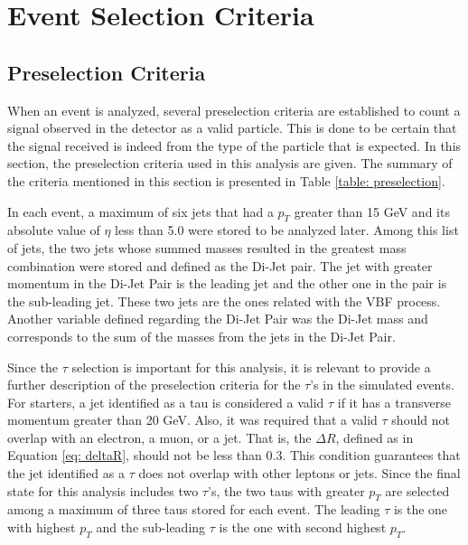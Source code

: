 \graphicspath{{SelectionCriteria/Figures/}}

\chapter{Event Selection Criteria}

\section{Preselection Criteria}

When an event is analyzed, several preselection criteria are established to count a signal observed in the detector as a valid particle. This is done to be certain that the signal received is indeed from the type of the particle that is expected. In this section, the preselection criteria used in this analysis are given. The summary of the criteria mentioned in this section is presented in Table \ref{table: preselection}. 

In each event, a maximum of six jets that had a $p_{T}$ greater than 15 GeV and its absolute value of $\eta$ less than 5.0 were stored to be analyzed later. Among this list of jets, the two jets whose summed masses resulted in the greatest mass combination were stored and defined as the Di-Jet pair. The jet with greater momentum in the Di-Jet Pair is the leading jet and the other one in the pair is the sub-leading jet. These two jets are the ones related with the VBF process. Another variable defined regarding the Di-Jet Pair was the Di-Jet mass and corresponds to the sum of the masses from the jets in the Di-Jet Pair.  

Since the $\tau$ selection is important for this analysis, it is relevant to provide a further description of the preselection criteria for the $\tau$'s in the simulated events. For starters, a jet identified as a tau is considered a valid $\tau$ if it has a transverse momentum greater than 20 GeV. Also, it was required that a valid $\tau$ should not overlap with an electron, a muon, or a jet. That is, the $\Delta R$, defined as in Equation \ref{eq: deltaR}, should not be less than 0.3. This condition guarantees that the jet identified as a $\tau$ does not overlap with other leptons or jets. Since the final state for this analysis includes two $\tau$'s, the two taus with greater $p_{T}$ are selected among a maximum of three taus stored for each event. The leading $\tau$ is the one with highest $p_{T}$ and the sub-leading $\tau$ is the one with second highest $p_{T}$.

